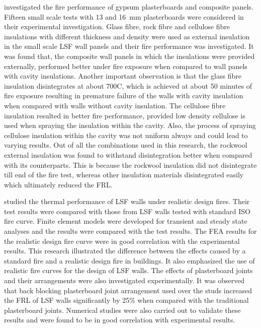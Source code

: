 \citet{Kolarkar2014} investigated the fire performance of gypsum plasterboards and composite panels. Fifteen small scale tests with 13 and 16~mm plasterboards were considered in their experimental investigation. Glass fibre, rock fibre and cellulose fibre insulations with different thickness and density were used as external insulation in the small scale LSF wall panels and their fire performance was investigated. It was found that, the composite wall panels in which the insulations were provided externally, performed better under fire exposure when compared to wall panels with cavity insulations. Another important observation is that the glass fibre insulation disintegrates at about 700\degree C, which is achieved at about 50 minutes of fire exposure resulting in premature failure of the walls with cavity insulation when compared with walls without cavity insulation. The cellulose fibre insulation resulted in better fire performance, provided low density cellulose is used when spraying the insulation within the cavity. Also, the process of spraying cellulose insulation within the cavity was not uniform always and could lead to varying results. Out of all the combinations used in this research, the rockwool external insulation was found to withstand disintegration better when compared with its counterparts. This is because the rockwool insulation did not disintegrate till end of the fire test, whereas other insulation materials disintegrated easily which ultimately reduced the FRL. 

\citet{Ariyanayagam2014e} studied the thermal performance of LSF walls under realistic design fires. Their test results were compared with those from LSF walls tested with standard ISO fire curve. Finite element models were developed for transient and steady state analyses and the results were compared with the test results. The FEA results for the realistic design fire curve were in good correlation with the experimental results. This research illustrated the difference between the effects caused by a standard fire and a realistic design fire in buildings. It also emphasized the use of realistic fire curves for the design of LSF walls. The effects of plasterboard joints and their arrangements were also investigated experimentally. It was observed that back blocking plasterboard joint arrangement used over the studs increased the FRL of LSF walls significantly by 25\% when compared with the traditional plasterboard joints. Numerical studies were also carried out to validate these results and were found to be in good correlation with experimental results. 

